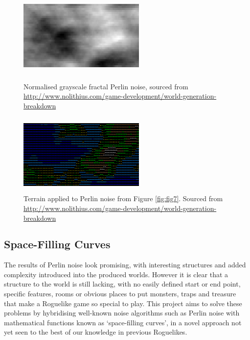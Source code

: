 \documentclass[12pt,a4paper]{article}
\begin{document}
\begin{figure}[h!]
\begin{minipage}{.5\textwidth}
  	\centering
 	\includegraphics[width=6.25cm,height=4cm]{images/perlin2.png}
	\caption[]{Normalised grayscale fractal Perlin noise, sourced from \url{http://www.nolithius.com/game-development/world-generation-breakdown}}
	\label{fig:fig7}
	\end{minipage}
	\begin{minipage}{.5\textwidth}
 	\centering
 	\includegraphics[width=6.25cm,height=4cm]{images/terrain.png}
	\caption[]{Terrain applied to Perlin noise from Figure \ref{fig:fig7}. Sourced from \url{http://www.nolithius.com/game-development/world-generation-breakdown}}
	\label{fig:fig8}
\end{minipage}
\end{figure}


\subsection{Space-Filling Curves}

The results of Perlin noise look promising, with interesting structures and added complexity introduced into the produced worlds. However it is clear that a structure to the world is still lacking, with no easily defined start or end point, specific features, rooms or obvious places to put monsters, traps and treasure that make a Roguelike game so special to play. This project aims to solve these problems by hybridising well-known noise algorithms such as Perlin noise with mathematical functions known as `space-filling curves', in a novel approach not yet seen to the best of our knowledge in previous Roguelikes.\\
\end{document}

